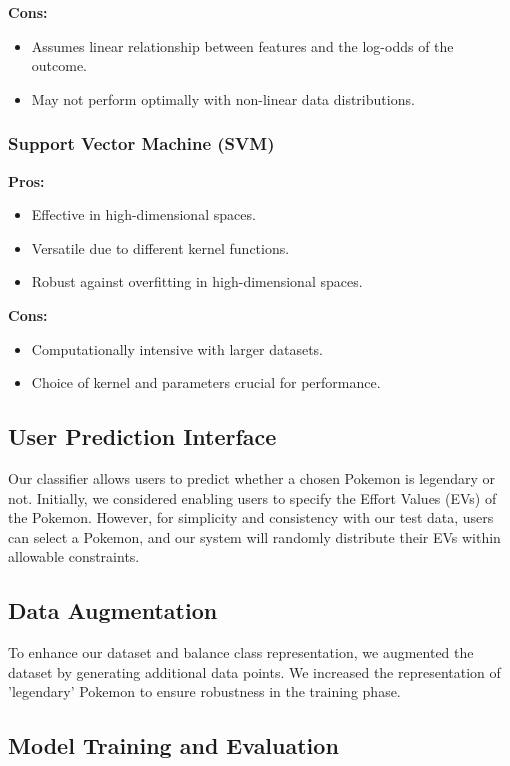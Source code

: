 \documentclass[conference]{IEEEtran}
\begin{document}
\textbf{Cons:}
\begin{itemize}
    \item Assumes linear relationship between features and the log-odds of the outcome.
    \item May not perform optimally with non-linear data distributions.
\end{itemize}

\subsubsection{Support Vector Machine (SVM)}
\textbf{Pros:}
\begin{itemize}
    \item Effective in high-dimensional spaces.
    \item Versatile due to different kernel functions.
    \item Robust against overfitting in high-dimensional spaces.
\end{itemize}

\textbf{Cons:}
\begin{itemize}
    \item Computationally intensive with larger datasets.
    \item Choice of kernel and parameters crucial for performance.
\end{itemize}

\subsection{User Prediction Interface}

Our classifier allows users to predict whether a chosen Pokemon is legendary or not. Initially, we considered enabling users to specify the Effort Values (EVs) of the Pokemon. However, for simplicity and consistency with our test data, users can select a Pokemon, and our system will randomly distribute their EVs within allowable constraints.

\subsection{Data Augmentation}

To enhance our dataset and balance class representation, we augmented the dataset by generating additional data points. We increased the representation of 'legendary' Pokemon to ensure robustness in the training phase.

\subsection{Model Training and Evaluation}
\end{document}
